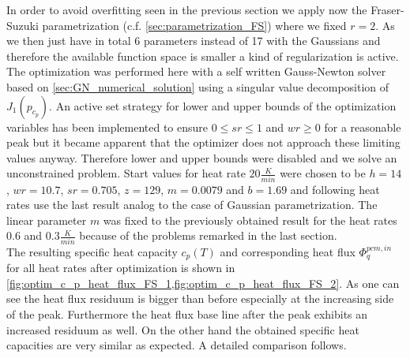 \documentclass{scrartcl}[12pt, halfparskip]
\numberwithin{equation}{section}
\numberwithin{figure}{section}
\numberwithin{table}{section}
\begin{document}
In order to avoid overfitting seen in the previous section we apply now the Fraser-Suzuki parametrization (c.f. \cref{sec:parametrization_FS}) where we fixed $r=2$. As we then just have in total 6 parameters instead of 17 with the Gaussians and therefore the available function space is smaller a kind of regularization is active. \\
The optimization was performed here with a self written Gauss-Newton solver based on \cref{sec:GN_numerical_solution} using a singular value decomposition of $J_1(p_{c_p})$. An active set strategy for lower and upper bounds of the optimization variables has been implemented to ensure $0 \le sr \le 1$ and $wr \ge 0$ for a reasonable peak but it became apparent that the optimizer does not approach these limiting values anyway. Therefore lower and upper bounds were disabled and we solve an unconstrained problem. Start values for heat rate $20 \frac{K}{min}$ were chosen to be $h=14$, $wr=10.7$, $sr=0.705$, $z=129$, $m=0.0079$ and $b=1.69$ and following heat rates use the last result analog to the case of Gaussian parametrization. The linear parameter $m$ was fixed to the previously obtained result for the heat rates $0.6$ and $0.3 \frac{K}{min}$ because of the problems remarked in the last section. \\
The resulting specific heat capacity $c_p(T)$ and corresponding heat flux $\varPhi_q^{pcm,in}$ for all heat rates after optimization is shown in \cref{fig:optim_c_p_heat_flux_FS_1,fig:optim_c_p_heat_flux_FS_2}. As one can see the heat flux residuum is bigger than before especially at the increasing side of the peak. Furthermore the heat flux base line after the peak exhibits an increased residuum as well. On the other hand the obtained specific heat capacities are very similar as expected. A detailed comparison follows.
\end{document}
